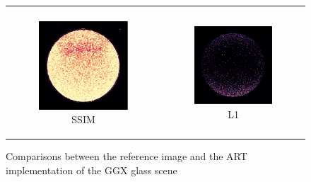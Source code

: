 \begin{figure}[h]
\begin{tabular}{cc}
\begin{subfigure}
			\caption{ART - our implementation}
		\end{subfigure} \\
		\begin{subfigure}
			{0.4\textwidth}\centering\includegraphics[width=\linewidth]{img/ggx_glass_SSIM.png}
			\caption{SSIM}
		\end{subfigure} 
		&
		\begin{subfigure}
			{0.4\textwidth}\centering\includegraphics[width=\linewidth]{img/ggx_glass_L1.png}
			\caption{L1}
		\end{subfigure}
	\end{tabular}
	\caption{Comparisons between the reference image and the ART implementation of the GGX glass scene}
	\label{fig:compare_ggx_glass}
\end{figure}

